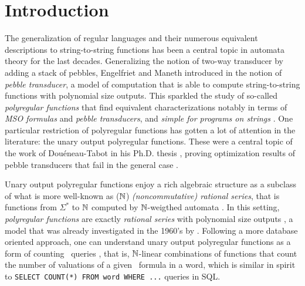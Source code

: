 \documentclass[11pt]{article}
\begin{document}
\maketitle
\makeabstract


\section{Introduction}
\label{intro:sec}

The generalization of regular languages and their numerous equivalent
descriptions to string-to-string functions has been a central topic in automata
theory for the last decades. Generalizing the notion of two-way transducer by
adding a stack of pebbles, Engelfriet and Maneth introduced in \cite{ENMA02}
the notion of \emph{pebble transducer}, a model of computation that is able to
compute string-to-string functions with polynomial size outputs. This sparkled
the study of so-called \emph{polyregular functions} that find equivalent
characterizations notably in terms of \emph{MSO formulas} and \emph{pebble
transducers}, and \emph{simple for programs on strings} \cite{BOJA18}. One
particular restriction of polyregular functions has gotten a lot of attention
in the literature: the unary output polyregular functions. These were a central
topic of the work of Douéneau-Tabot in his Ph.D. thesis \cite[Part II]{DOUE23},
proving optimization results of pebble transducers \cite{DOUE21,DOUE22} that
fail in the general case \cite[Theorem III.3]{BOJA23}.

Unary output polyregular functions enjoy a rich algebraic structure as a
subclass of what is more well-known as ($\mathbb{N}$) \emph{(noncommutative) rational
series}, that is functions from $\Sigma^*$ to $\mathbb{N}$ computed by
$\mathbb{N}$-weigthed automata \cite{BERE88,BERE10}. In this setting,
\emph{polyregular functions} are exactly \emph{rational series} with polynomial
size outputs \cite[Theorem]{DOUE23}, a model that was already investigated in
the 1960's by \cite{SCHU62}. Following a more database oriented approach, one
can understand unary output polyregular functions as a form of counting \MSO\
queries \cite{KRRC13}, that is, $\mathbb{N}$-linear combinations of functions that
count the number of valuations of a given \MSO\ formula in a word, which is
similar in spirit to \texttt{SELECT COUNT(*) FROM word WHERE ...} queries in
SQL.
\end{document}
